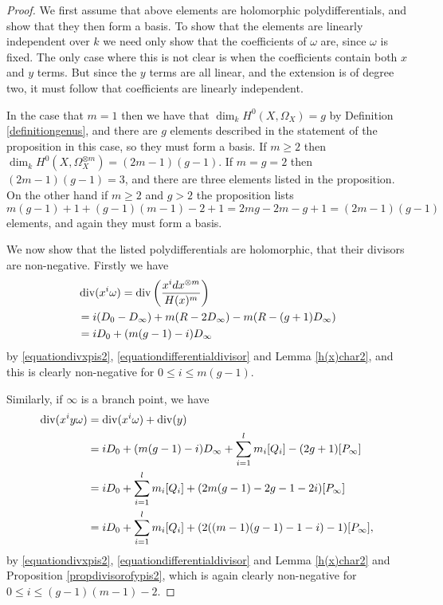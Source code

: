     \begin{proof}
    We first assume that above elements are holomorphic polydifferentials, and show that they then form a basis.
    To show that the elements are linearly independent over $k$ we need only show that the coefficients of $\omega$ are, since $\omega$ is fixed.
    The only case where this is not clear is when the coefficients contain both $x$ and $y$ terms.
    But since the $y$ terms are all linear, and the extension is of degree two, it must follow that coefficients are linearly independent.
    
    
    In the case that $m=1$ then we have that $\dim_k H^0(X,\Omega_X) =g$ by Definition \ref{definitiongenus}, and there are $g$ elements described in the statement of the proposition in this case, so they must form a basis.
    If $m \geq 2$ then $\dim_k H^0(X,\Omega_X^{\otimes m}) = (2m-1)(g-1)$.
    If $m=g=2$ then $(2m-1)(g-1) = 3$, and there are three elements listed in the proposition.
    On the other hand if $m\geq 2$ and $g > 2$ the proposition lists
        \[
        m(g-1)+1 + (g-1)(m-1)-2+1 = 2mg -2m -g +1 = (2m-1)(g-1)
        \]
    elements, and again they must form a basis.
    
    We now show that the listed polydifferentials are holomorphic, \ie that their divisors are non-negative.
    Firstly we have
        \begin{align*}
        & \operatorname{div}(x^i\omega)  =  \operatorname{div} \left( \frac{x^i dx^{\otimes m}}{H(x)^m} \right)\\ 
        & =  i(D_0 - D_\infty) +m(R-2D_\infty) - m(R - (g+1)D_\infty) \\
        & =  iD_0 + (m(g-1) -i)D_\infty
        \end{align*}
    by \eqref{equationdivxpis2}, \eqref{equationdifferentialdivisor} and Lemma \ref{h(x)char2}, and this is clearly non-negative for $0\leq i \leq m(g-1)$.
    
    Similarly, if $\infty$ is a branch point, we have
        \begin{align*}
        \operatorname{div}(x^iy\omega) & =  \operatorname{div} (x^i\omega) + \operatorname{div}(y) \\
        & =  iD_0 + (m(g-1) -i)D_\infty + \sum_{i=1}^l m_i[Q_i] - (2g+1)[P_\infty] \\
        & =  iD_0 +  \sum_{i=1}^l m_i[Q_i] + (2m(g-1) -2g-1 -2i)[P_\infty] \\
        & =  iD_0 +  \sum_{i=1}^l m_i[Q_i] + (2((m-1)(g-1) -1 -i)-1)[P_\infty],
        \end{align*}
    by \eqref{equationdivxpis2}, \eqref{equationdifferentialdivisor} and Lemma \ref{h(x)char2} and Proposition \ref{propdivisorofypis2}, which is again clearly non-negative for $0 \leq i \leq (g-1)(m-1)-2$.


\end{proof}
